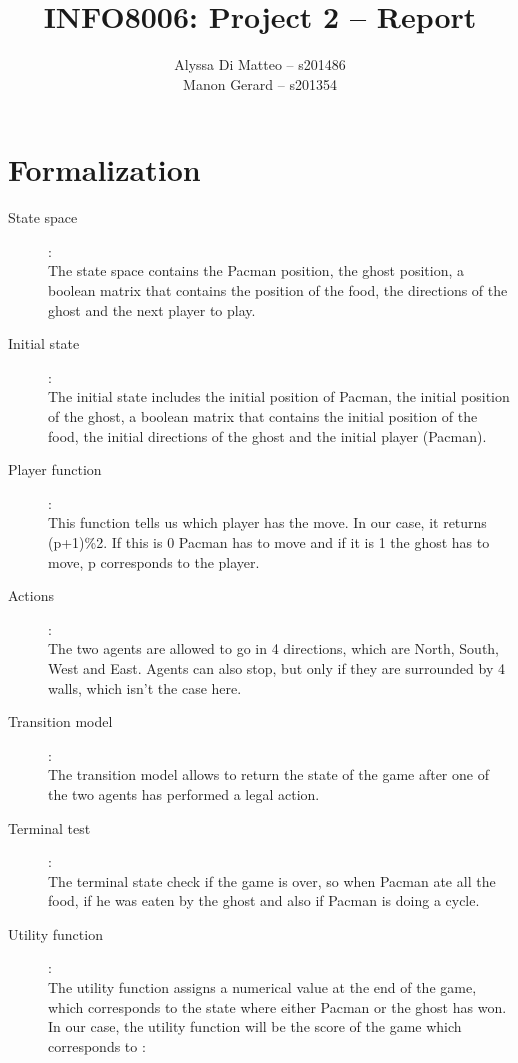 \documentclass{article}
\title{\Large{INFO8006: Project 2 -- Report}}
\author{Alyssa Di Matteo -- s201486\\Manon Gerard -- s201354}
\begin{document}
\maketitle

\section{Formalization}

\begin{description}
    
    \item[State space]:\\
    The state space contains the Pacman position, the ghost position, a boolean matrix that contains the position of the food, the directions of the ghost and the next player to play. 
    
    \item[Initial state]:\\
    The initial state includes the initial position of Pacman, the initial position of the ghost, a boolean matrix that contains the initial position of the food, the initial directions of the ghost and the initial player (Pacman). 
    
    \item[Player function]: \\
    This function tells us which player has the move. In our case, it returns (p+1)\%2. If this is 0 Pacman has to move and if it is 1 the ghost has to move, p corresponds to the player.
    
    \item[Actions]: \\
    The two agents are allowed to go in 4 directions, which are North, South, West and East. Agents can also stop, but only if they are surrounded by 4 walls, which isn't the case here.
    
    \item[Transition model] : \\
    The transition model allows to return the state of the game after one of the two agents has performed a legal action.

    
    \item[Terminal test]: \\
    The terminal state check if the game is over, so when Pacman ate all the food, if he was eaten by the ghost and also if Pacman is doing a cycle.
    
    \item[Utility function]:\\
    The utility function assigns a numerical value at the end of the game, which corresponds to the state where either Pacman or the ghost has won. In our case, the utility function will be the score of the game which corresponds to :
\begin{center}


\end{center}
\end{description}
\end{document}
